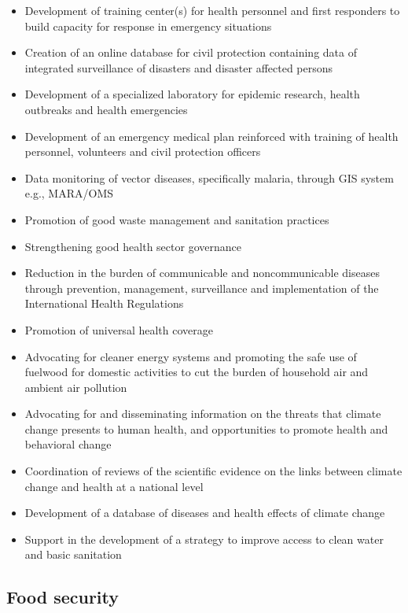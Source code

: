 \documentclass[
]{book}
\providecommand{\tightlist}{%
  \setlength{\itemsep}{0pt}\setlength{\parskip}{0pt}}
\begin{document}
\begin{itemize}
\tightlist
\item
  Development of training center(s) for health personnel and first responders to build capacity for response in emergency situations
\item
  Creation of an online database for civil protection containing data of integrated surveillance of disasters and disaster affected persons
\item
  Development of a specialized laboratory for epidemic research, health outbreaks and health emergencies
\item
  Development of an emergency medical plan reinforced with training of health personnel, volunteers and civil protection officers
\item
  Data monitoring of vector diseases, specifically malaria, through GIS system e.g., MARA/OMS
\item
  Promotion of good waste management and sanitation practices\\
\item
  Strengthening good health sector governance
\item
  Reduction in the burden of communicable and noncommunicable diseases through prevention, management, surveillance and implementation of the International Health Regulations
\item
  Promotion of universal health coverage
\item
  Advocating for cleaner energy systems and promoting the safe use of fuelwood for domestic activities to cut the burden of household air and ambient air pollution
\item
  Advocating for and disseminating information on the threats that climate change presents to human health, and opportunities to promote health and behavioral change
\item
  Coordination of reviews of the scientific evidence on the links between climate change and health at a national level
\item
  Development of a database of diseases and health effects of climate change
\item
  Support in the development of a strategy to improve access to clean water and basic sanitation
\end{itemize}

\hypertarget{food-security}{%
\subsection{Food security}\label{food-security}}
\end{document}
